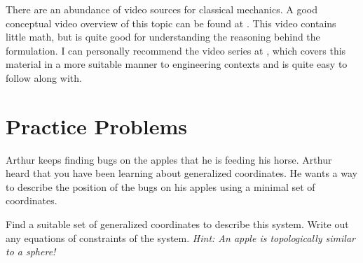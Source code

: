There are an abundance of video sources for classical mechanics. A good conceptual video overview of this topic can be found at \cite{veritasium_closest_2024}. This video contains little math, but is quite good for understanding the reasoning behind the formulation. I can personally recommend the video series at \cite{ross_lagranges_nodate}, which covers this material in a more suitable manner to engineering contexts and is quite easy to follow along with.

\newpage
\section{Practice Problems}
\begin{exercise}
Arthur keeps finding bugs on the apples that he is feeding his horse. Arthur heard that you have been learning about \glspl{generalized coordinate}. He wants a way to describe the position of the bugs on his apples using a minimal set of coordinates.

Find a suitable set of \glspl{generalized coordinate} to describe this system. Write out any equations of constraints of the system. \textit{Hint: An apple is topologically similar to a sphere!}

\end{exercise}

